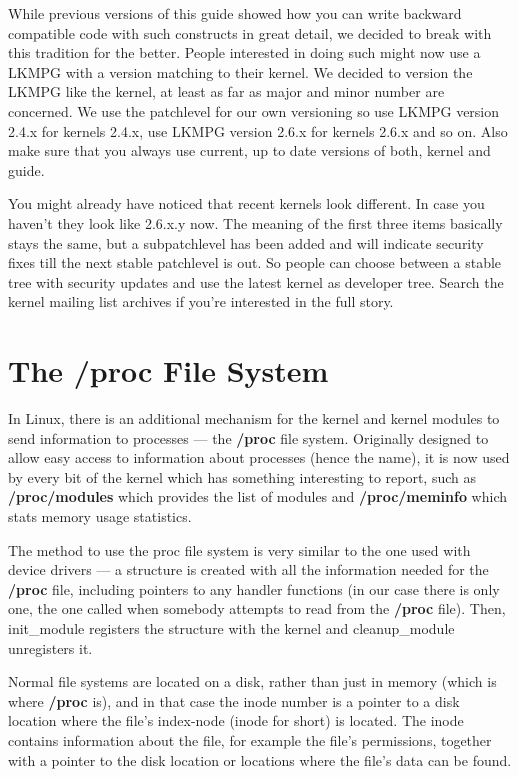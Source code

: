 \documentclass[11pt]{article}
\begin{document}
While previous versions of this guide showed how you can write backward compatible code with such constructs in great detail, we decided to break with this tradition for the better. People interested in doing such might now use a LKMPG with a version matching to their kernel. We decided to version the LKMPG like the kernel, at least as far as major and minor number are concerned. We use the patchlevel for our own versioning so use LKMPG version 2.4.x for kernels 2.4.x, use LKMPG version 2.6.x for kernels 2.6.x and so on. Also make sure that you always use current, up to date versions of both, kernel and guide.

You might already have noticed that recent kernels look different. In case you haven't they look like 2.6.x.y now. The meaning of the first three items basically stays the same, but a subpatchlevel has been added and will indicate security fixes till the next stable patchlevel is out. So people can choose between a stable tree with security updates and use the latest kernel as developer tree. Search the kernel mailing list archives if you're interested in the full story.

\section*{The /proc File System}
\label{sec:org60ea81e}
In Linux, there is an additional mechanism for the kernel and kernel modules to send information to processes --- the \textbf{/proc} file system. Originally designed to allow easy access to information about processes (hence the name), it is now used by every bit of the kernel which has something interesting to report, such as \textbf{/proc/modules} which provides the list of modules and \textbf{/proc/meminfo} which stats memory usage statistics.

The method to use the proc file system is very similar to the one used with device drivers --- a structure is created with all the information needed for the \textbf{/proc} file, including pointers to any handler functions (in our case there is only one, the one called when somebody attempts to read from the \textbf{/proc} file). Then, init\_module registers the structure with the kernel and cleanup\_module unregisters it.

Normal file systems are located on a disk, rather than just in memory (which is where \textbf{/proc} is), and in that case the inode number is a pointer to a disk location where the file's index-node (inode for short) is located. The inode contains information about the file, for example the file's permissions, together with a pointer to the disk location or locations where the file's data can be found.
\end{document}
